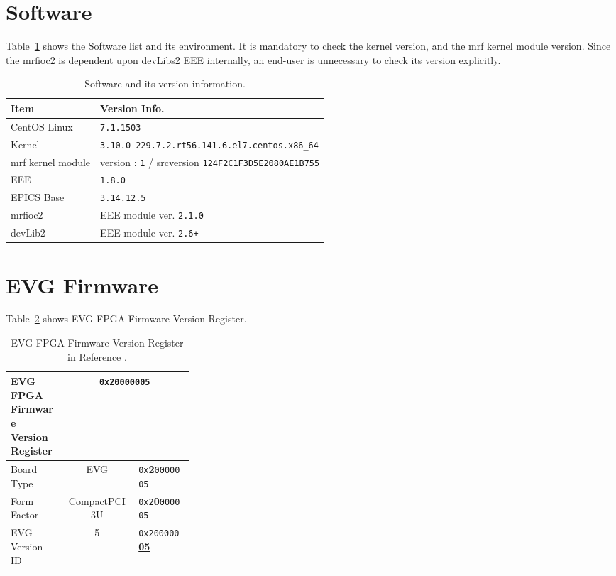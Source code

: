 \documentclass[11pt
  , a4paper
  , article
  , oneside
  , showtrims
]{memoir}
\begin{document}
\section{Software}
Table~\ref{table:swlist} shows the Software list and its environment. It is mandatory to check the kernel version, and the mrf kernel module version. Since the mrfioc2 is dependent upon devLibs2 EEE internally, an end-user is unnecessary to check its version explicitly. 
\begin{table}[!htb]
  \centering
  \begin{tabular}{l|l}
    \toprule
    Item               & Version Info.                                            \\\midrule
    CentOS Linux       & \texttt{7.1.1503}                                        \\\midrule
    Kernel             & \texttt{3.10.0-229.7.2.rt56.141.6.el7.centos.x86\_64}    \\\midrule
    mrf kernel module  & version : \texttt{1} / srcversion \texttt{124F2C1F3D5E2080AE1B755} \\\midrule
    EEE                & \texttt{1.8.0}                                  \\\midrule
    EPICS Base         & \texttt{3.14.12.5}                              \\\midrule
    mrfioc2            & EEE module ver. \texttt{2.1.0}                  \\\midrule
    devLib2            & EEE module ver. \texttt{2.6+}                   \\\bottomrule
  \end{tabular}
  \caption[]{Software and its version information.}
  \label{table:swlist}
\end{table}

\section{EVG Firmware}
Table~\ref{table:fwinfo} shows EVG FPGA Firmware Version Register.

\begin{table}[!htb]
  \centering
  \begin{tabular}{p{0.3\linewidth}|c|l}
    \toprule
    EVG FPGA Firmware Version Register            & \multicolumn{2}{c}{\texttt{0x20000005}}             \\\midrule
    Board Type      & EVG                         &  \texttt{0x}\underline{\textbf{2}}\texttt{0000005}  \\\midrule
    Form Factor     & CompactPCI 3U               &  \texttt{0x2}\underline{\textbf{0}}\texttt{000005}  \\\midrule
    EVG Version ID  & 5                           &  \texttt{0x200000}\underline{\textbf{05}}           \\\bottomrule
  \end{tabular}
  \caption[]{EVG FPGA Firmware Version Register in Reference \citep[see][p32]{MRFEVENTGENERATOR}.}
  \label{table:fwinfo}
\end{table}
\end{document}
